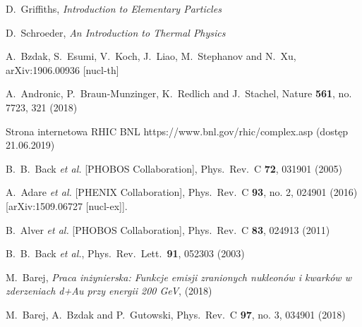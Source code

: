 \documentclass[a4paper,12pt]{article}
\begin{document}
\newpage
\begin{thebibliography}{9}
 D.~Griffiths, \textit{Introduction to Elementary Particles}

 D.~Schroeder, \textit{An Introduction to Thermal Physics}

A.~Bzdak, S.~Esumi, V.~Koch, J.~Liao, M.~Stephanov and N.~Xu,
  arXiv:1906.00936 [nucl-th]

  A.~Andronic, P.~Braun-Munzinger, K.~Redlich and J.~Stachel,
  Nature {\bf 561}, no. 7723, 321 (2018)

 Strona internetowa RHIC BNL https://www.bnl.gov/rhic/complex.asp (dostęp 21.06.2019)

  B.~B.~Back {\it et al.} [PHOBOS Collaboration],
  Phys.\ Rev.\ C {\bf 72}, 031901 (2005)

  A.~Adare {\it et al.} [PHENIX Collaboration],
  Phys.\ Rev.\ C {\bf 93}, no. 2, 024901 (2016)
  [arXiv:1509.06727 [nucl-ex]].

  B.~Alver {\it et al.} [PHOBOS Collaboration],
  Phys.\ Rev.\ C {\bf 83}, 024913 (2011)

  B.~B.~Back {\it et al.},
  Phys.\ Rev.\ Lett.\  {\bf 91}, 052303 (2003)

  M.~Barej, \textit{Praca inżynierska: Funkcje emisji zranionych nukleonów i kwarków w zderzeniach d+Au przy energii 200 GeV}, (2018)

  M.~Barej, A.~Bzdak and P.~Gutowski,
  Phys.\ Rev.\ C {\bf 97}, no. 3, 034901 (2018)


\end{thebibliography}
\end{document}
